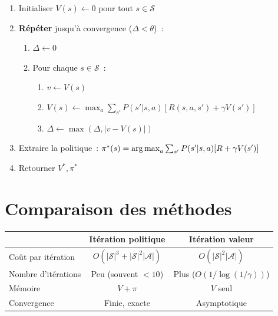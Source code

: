 \begin{algorithme}[title=\textbf{It\'eration sur la valeur (\emph{Value Iteration})}]
\begin{enumerate}
    \item Initialiser $V(s) \leftarrow 0$ pour tout $s \in \mathcal{S}$
    \item \textbf{R\'ep\'eter} jusqu'\`a convergence ($\Delta < \theta$)~:
    \begin{enumerate}
        \item $\Delta \leftarrow 0$
        \item Pour chaque $s \in \mathcal{S}$~:
        \begin{enumerate}
            \item $v \leftarrow V(s)$
            \item $V(s) \leftarrow \max_a \sum_{s'} P(s'|s,a)[R(s,a,s') + \gamma V(s')]$
            \item $\Delta \leftarrow \max(\Delta, |v - V(s)|)$
        \end{enumerate}
    \end{enumerate}
    \item Extraire la politique~: $\pi^*(s) = \operatorname*{arg\,max}_a \sum_{s'} P(s'|s,a)[R + \gamma V(s')]$
    \item Retourner $V^*, \pi^*$
\end{enumerate}
\end{algorithme}

\section{Comparaison des m\'ethodes}

\begin{center}
\renewcommand{\arraystretch}{1.3}
\begin{tabular}{lcc}
    \toprule
    & \textbf{It\'eration politique} & \textbf{It\'eration valeur} \\
    \midrule
    Co\^ut par it\'eration & $O(|\mathcal{S}|^3 + |\mathcal{S}|^2 |\mathcal{A}|)$ &
    $O(|\mathcal{S}|^2 |\mathcal{A}|)$ \\
    Nombre d'it\'erations & Peu (souvent $< 10$) & Plus ($O(1/\log(1/\gamma))$) \\
    M\'emoire & $V + \pi$ & $V$ seul \\
    Convergence & Finie, exacte & Asymptotique \\
    \bottomrule
\end{tabular}
\end{center}

